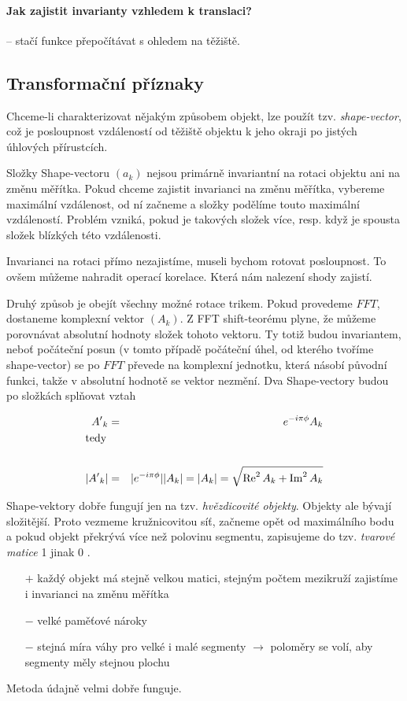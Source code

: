 \paragraph{Jak zajistit invarianty vzhledem k translaci?} -- stačí funkce přepočítávat s ohledem na těžiště.

\subsection{Transformační příznaky}
Chceme-li charakterizovat nějakým způsobem objekt, lze použít tzv. {\em shape-vector},  což je posloupnost vzdáleností
od těžiště objektu k jeho okraji po jistých úhlových přírustcích. 

Složky Shape-vectoru $(a_k)$ nejsou primárně invariantní na rotaci objektu ani na změnu měřítka. Pokud chceme 
zajistit invarianci na změnu měřítka, vybereme maximální vzdálenost, od ní začneme a složky podělíme touto maximální
vzdáleností. Problém vzniká, pokud je takových složek více, resp. když je spousta složek blízkých této vzdálenosti.

Invarianci na rotaci přímo nezajistíme, museli bychom rotovat posloupnost. To ovšem můžeme nahradit operací
korelace. Která nám nalezení shody zajistí.

Druhý způsob je obejít všechny možné rotace trikem.
Pokud provedeme $FFT$, dostaneme komplexní vektor  $(A_k)$. Z FFT shift-teorému plyne, že  můžeme porovnávat 
absolutní hodnoty složek tohoto vektoru. Ty totiž budou invariantem, neboť počáteční posun (v tomto případě počáteční úhel,
od kterého tvoříme shape-vector) se po $FFT$ převede na komplexní jednotku, která násobí původní funkci, takže v absolutní
hodnotě se vektor nezmění. Dva Shape-vectory  budou po složkách splňovat vztah

\begin{eqnarray}
{A'}_k&=&e^{-i\pi\phi}A_k\\
\noalign{\hbox{tedy}\nonumber}\\
|{A'}_k|&=&|e^{-i\pi\phi}||A_k|=|A_k|=\sqrt{\Re^2A_k+\Im^2A_k}
\end{eqnarray}

Shape-vektory dobře fungují jen na tzv. {\em hvězdicovité objekty}. Objekty ale bývají složitější. Proto vezmeme
kružnicovitou síť, začneme opět od maximálního bodu a pokud objekt překrývá více než polovinu segmentu, zapisujeme
do tzv. {\em tvarové matice} 1 jinak 0 . 
\begin{itemize}
\item[$+$] každý objekt má stejně velkou matici, stejným počtem mezikruží zajistíme i invarianci na změnu měřítka
\item[$-$] velké paměťové nároky
\item[$-$] stejná míra váhy pro velké i malé segmenty $\rightarrow$ poloměry se volí, aby segmenty měly stejnou plochu
\end{itemize}
Metoda údajně velmi dobře funguje.

